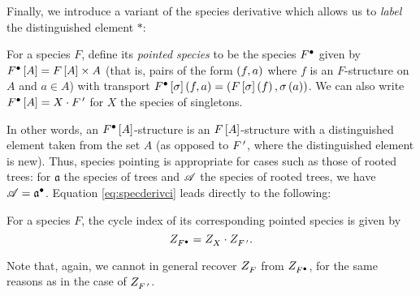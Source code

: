 \documentclass[distribution,draft]{brandiss} %
\numberwithin{section}{chapter}
\numberwithin{figure}{chapter}
\begin{document}
Finally, we introduce a variant of the species derivative which allows us to \emph{label} the distinguished element $*$:
\begin{definition}
  \label{def:specpoint}
  For a species $F$, define its \emph{pointed species} to be the species $ {F}^{\bullet } $ given by $ {F}^{\bullet }  \left[ {A} \right] = F \left[ {A} \right] \times A$ (that is, pairs of the form $\left( {f, a} \right)$ where $f$ is an $F$-structure on $A$ and $a \in A$) with transport $ {F}^{\bullet }  \left[ {\sigma} \right] \left( {f, a} \right) = \left( {F \left[ {\sigma} \right] \left( {f} \right), \sigma \left( {a} \right)} \right)$.
  We can also write $ {F}^{\bullet }  \left[ {A} \right] = X \cdot  {F}^{\,\prime } $ for $X$ the species of singletons.
\end{definition}
In other words, an $ {F}^{\bullet }  \left[ {A} \right]$-structure is an $F \left[ {A} \right]$-structure with a distinguished element taken from the set $A$ (as opposed to $ {F}^{\,\prime } $, where the distinguished element is new).
Thus, species pointing is appropriate for cases such as those of rooted trees: for $\mathfrak{a}$ the species of trees and $\mathscr{A}$ the species of rooted trees, we have $\mathscr{A} =  {\mathfrak{a}}^{\bullet } $.
Equation \eqref{eq:specderivci} leads directly to the following:
\begin{theorem}
  \label{thm:specpointci}
  For a species $F$, the cycle index of its corresponding pointed species is given by
  \begin{equation}
    \label{eq:specpointci}
     Z_{ {F}^{\bullet } }^{}  =  Z_{X}^{}  \cdot  Z_{ {F}^{\,\prime } }^{} .
  \end{equation}
\end{theorem}
Note that, again, we cannot in general recover $ Z_{F}^{} $ from $ Z_{ {F}^{\bullet } }^{} $, for the same reasons as in the case of $ Z_{ {F}^{\,\prime } }^{} $.
\end{document}

